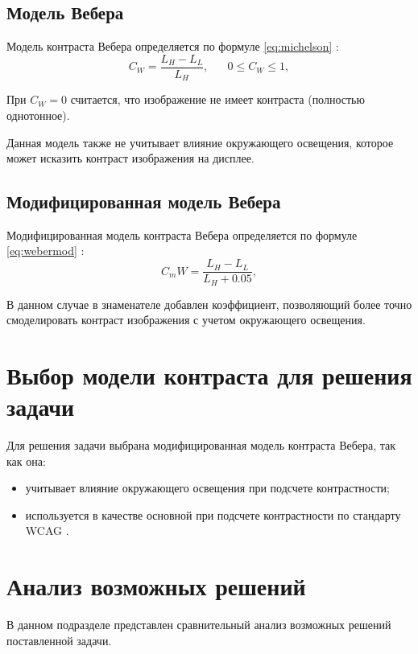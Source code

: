 \subsection{Модель Вебера}

Модель контраста Вебера определяется по формуле \ref{eq:michelson} \cite{weber}:
\begin{equation}
	\label{eq:weber}
	C_W=\frac{L_H-L_L}{L_H}, \text{~~~~~$0 \le C_W \le 1$},
\end{equation}

При $C_W = 0$ считается, что изображение не имеет контраста (полностью однотонное).

Данная модель также не учитывает влияние окружающего освещения, которое может исказить контраст изображения на дисплее.

\subsection{Модифицированная модель Вебера}

Модифицированная модель контраста Вебера определяется по формуле \ref{eq:webermod} \cite{weber}:
\begin{equation}
	\label{eq:webermod}
	C_mW=\frac{L_H-L_L}{L_H + 0.05},
\end{equation}

В данном случае в знаменателе добавлен коэффициент, позволяющий более точно смоделировать контраст изображения с учетом окружающего освещения.

\section{Выбор модели контраста для решения задачи}

Для решения задачи выбрана модифицированная модель контраста Вебера, так как она:

\begin{itemize}
	\item учитывает влияние окружающего освещения при подсчете контрастности;
	\item используется в качестве основной при подсчете контрастности по стандарту WCAG \cite{wcag}.
\end{itemize}

\section{Анализ возможных решений}

В данном подразделе представлен сравнительный анализ возможных решений поставленной задачи.


